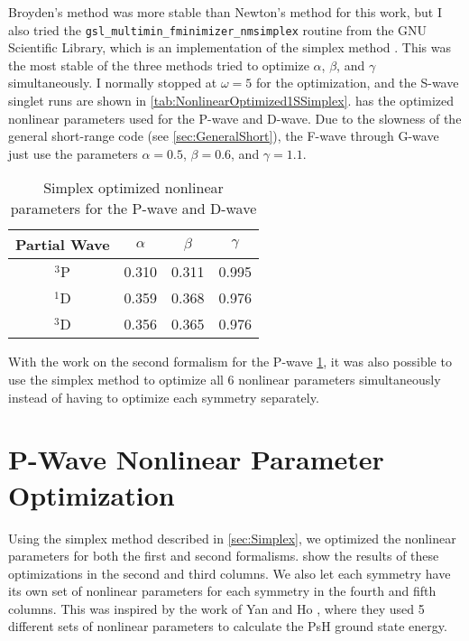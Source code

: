 \documentclass[Dissertation.tex]{subfiles}
\begin{document}
Broyden's method was more stable than Newton's method for this work, but I 
also tried the \texttt{gsl\_multimin\_fminimizer\_nmsimplex} routine from the 
GNU Scientific Library, which is an implementation of the simplex method
\cite{GSL,GSLsimplex}. This was the most stable of the three methods tried to 
optimize $\alpha$, $\beta$, and $\gamma$ simultaneously. I normally stopped 
at $\omega = 5$ for the optimization, and the S-wave singlet runs are shown 
in \cref{tab:NonlinearOptimized1SSimplex}.  
has the optimized nonlinear parameters used for the P-wave and D-wave. Due to 
the slowness of the general short-range code (see \cref{sec:GeneralShort}), 
the F-wave through G-wave just use the parameters $\alpha = 0.5$, $\beta = 0.6$,
and $\gamma = 1.1$.

\begin{table}
\small
\centering
\begin{tabular}{c c c c}
\toprule
Partial Wave & $\alpha$ & $\beta$ & $\gamma$ \\
\midrule
$^3$P & 0.310 & 0.311 & 0.995 \\
$^1$D & 0.359 & 0.368 & 0.976 \\
$^3$D & 0.356 & 0.365 & 0.976 \\
\bottomrule
\end{tabular}
\caption{Simplex optimized nonlinear parameters for the P-wave and D-wave}
\label{tab:NonlinearOptimizedPD}
\end{table}

With the work on the second formalism for the P-wave \cref{sec:PWaveOpt}, it 
was also possible to use the simplex method to optimize all 6 nonlinear 
parameters simultaneously instead of having to optimize each symmetry 
separately. %


\section{P-Wave Nonlinear Parameter Optimization}
\label{sec:PWaveOpt}

Using the simplex method described in \cref{sec:Simplex}, we optimized the nonlinear parameters for both the first and second formalisms.  show the results of these optimizations in the second and third columns. We also let each symmetry have its own set of nonlinear parameters for each symmetry in the fourth and fifth columns. This was inspired by the work of Yan and Ho \cite{Yan1999}, where they used 5 different sets of nonlinear parameters to calculate the PsH ground state energy.
\end{document}
